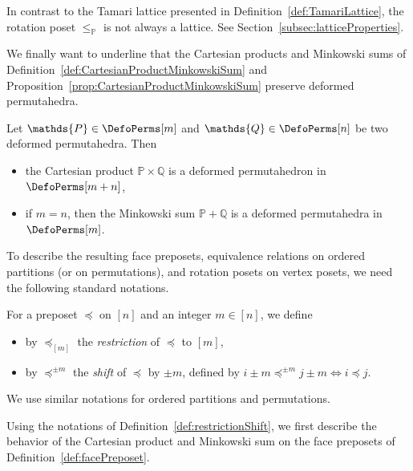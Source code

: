 \documentclass[AHL,Unicode,longabstracts,published]{cedram}
\newcommand{\polytope}[1]{\mathds{#1}}
\begin{document}
\begin{rema}\label{rem:equivalenceNotLattice}
In contrast to the Tamari lattice presented in Definition~\ref{def:TamariLattice}, the rotation poset $\le_\polytope{P}$ is not always a lattice. See Section~\ref{subsec:latticeProperties}.
\end{rema}


We finally want to underline that the Cartesian products and Minkowski sums of Definition~\ref{def:CartesianProductMinkowskiSum} and Proposition~\ref{prop:CartesianProductMinkowskiSum} preserve deformed permutahedra.

\begin{prop}\label{prop:CartesianProductMinkowskiSumDeformedPermutahedra}
Let $\polytope{P} \in \DefoPerms[m]$ and $\polytope{Q} \in \DefoPerms[n]$ be two deformed permutahedra. Then
\begin{itemize}
\item the Cartesian product ${\polytope{P} \times \polytope{Q}}$ is a deformed permutahedron in $\DefoPerms[m+n]$,
\item if $m = n$, then the Minkowski sum $\polytope{P} + \polytope{Q}$ is a deformed permutahedra in~$\DefoPerms[m]$.
\end{itemize}
\end{prop}

To describe the resulting face preposets, equivalence relations on ordered partitions (or on permutations), and rotation posets on vertex posets, we need the following standard notations.

\break
\begin{defi}\label{def:restrictionShift}
For a preposet $\preccurlyeq$ on $[n]$ and an integer $m \in [n]$, we define
\begin{itemize}
\item by $\preccurlyeq_{[m]}$ the
\emph{restriction} of $\preccurlyeq$ to $[m]$,
\item by $\preccurlyeq^{\pm m}$ the
\emph{shift} of $\preccurlyeq$ by $\pm m$, defined by $i \pm m \preccurlyeq^{\pm m} j \pm m \iff i \preccurlyeq j$.
\end{itemize}
We use similar notations for ordered partitions and permutations.
\end{defi}

Using the notations of Definition~\ref{def:restrictionShift}, we first describe the behavior of the Cartesian product and Minkowski sum on the face preposets of Definition~\ref{def:facePreposet}.
\end{document}
